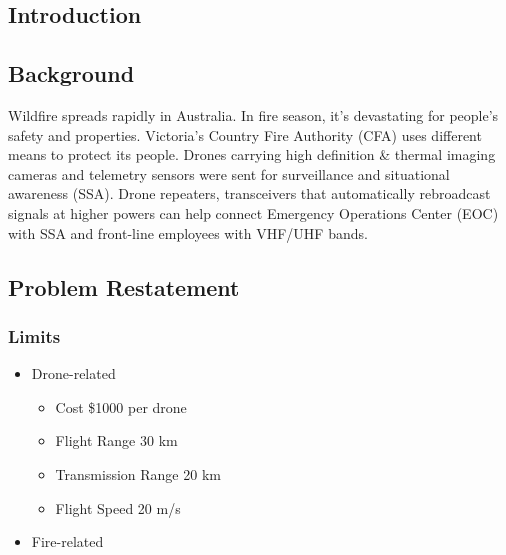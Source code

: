\documentclass{mcmthesis}
\title{}
\date{\today}
\begin{document}
\setlength{\parskip}{0.1\baselineskip}
\begin{spacing}{1}
  
\end{spacing} 


\begin{spacing}{1}

\tableofcontents
\newpage




\section{Introduction}

\graphicspath{{figures/}{../figures/}}

\subsection{Background}
Wildfire spreads rapidly in Australia. 
In fire season, it's devastating for people's safety and properties. Victoria's
Country Fire Authority (CFA) uses different means to protect its people. 
Drones carrying high definition \& thermal imaging cameras and telemetry 
sensors were sent for surveillance and situational awareness (SSA). 
Drone repeaters, transceivers that automatically rebroadcast signals 
at higher powers can help connect Emergency Operations Center (EOC) with SSA and front-line employees with VHF/UHF bands.

\subsection{Problem Restatement}

\subsubsection{Limits}

\begin{itemize}
  \item
    Drone-related
  
    \begin{itemize}
    \item
      Cost \$1000 per drone
    \item
      Flight Range 30 km
    \item
      Transmission Range 20 km
    \item
      Flight Speed 20 m/s
    \end{itemize}
  \item
    Fire-related
  

\end{itemize}
\end{spacing}
\end{document}
